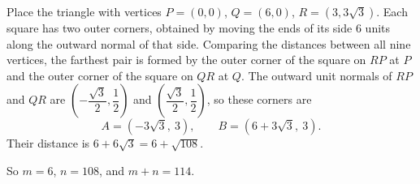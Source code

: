 Place the triangle with vertices $P=(0,0)$, $Q=(6,0)$, $R=(3,3\sqrt3)$. Each square has two outer corners, obtained by moving the ends of its side $6$ units along the outward normal of that side. Comparing the distances between all nine vertices, the farthest pair is formed by the outer corner of the square on $RP$ at $P$ and the outer corner of the square on $QR$ at $Q$. The outward unit normals of $RP$ and $QR$ are $\left(-\dfrac{\sqrt3}{2},\dfrac{1}{2}\right)$ and $\left(\dfrac{\sqrt3}{2},\dfrac{1}{2}\right)$, so these corners are
\[
A=\left(-3\sqrt3,\ 3\right),\qquad B=\left(6+3\sqrt3,\ 3\right).
\]
Their distance is $6+6\sqrt3=6+\sqrt{108}$.


So $m=6$, $n=108$, and $m+n=\boxed{114}$.
